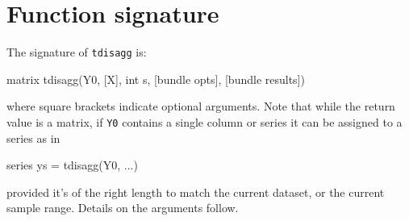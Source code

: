 \section{Function signature}
\label{sec:tdisagg-sig}

The signature of \texttt{tdisagg} is:
\begin{code}
matrix tdisagg(Y0, [X], int s, [bundle opts], [bundle results])
\end{code}
where square brackets indicate optional arguments. Note that while the
return value is a matrix, if \texttt{Y0} contains a single column or
series it can be assigned to a series as in
\begin{code}
series ys = tdisagg(Y0, ...)
\end{code}
provided it's of the right length to match the current dataset, or the
current sample range. Details on the arguments follow.

